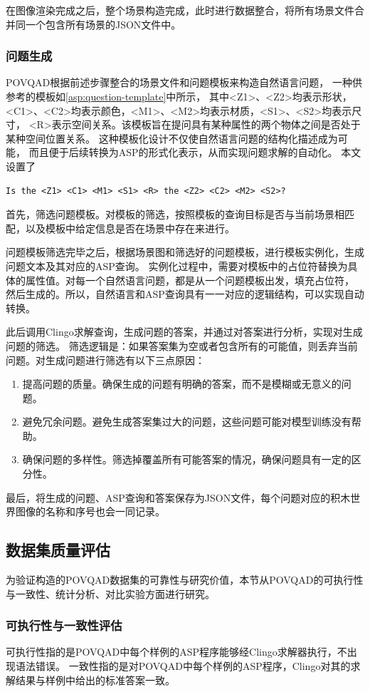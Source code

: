在图像渲染完成之后，整个场景构造完成，此时进行数据整合，将所有场景文件合并同一个包含所有场景的JSON文件中。
\subsubsection{问题生成}
POVQAD根据前述步骤整合的场景文件和问题模板来构造自然语言问题，
一种供参考的模板如\ref{asp:question-template}中所示，
其中<Z1>、<Z2>均表示形状，<C1>、<C2>均表示颜色，<M1>、<M2>均表示材质，<S1>、<S2>均表示尺寸，
<R>表示空间关系。该模板旨在提问具有某种属性的两个物体之间是否处于某种空间位置关系。
这种模板化设计不仅使自然语言问题的结构化描述成为可能，
而且便于后续转换为ASP的形式化表示，从而实现问题求解的自动化。
本文设置了
\begin{lstlisting}[label=asp:question-template]
Is the <Z1> <C1> <M1> <S1> <R> the <Z2> <C2> <M2> <S2>?  
\end{lstlisting}

首先，筛选问题模板。对模板的筛选，按照模板的查询目标是否与当前场景相匹配，以及模板中给定信息是否在场景中存在来进行。

问题模板筛选完毕之后，根据场景图和筛选好的问题模板，进行模板实例化，生成问题文本及其对应的ASP查询。
实例化过程中，需要对模板中的占位符替换为具体的属性值。对每一个自然语言问题，都是从一个问题模板出发，填充占位符，
然后生成的。所以，自然语言和ASP查询具有一一对应的逻辑结构，可以实现自动转换。

此后调用Clingo求解查询，生成问题的答案，并通过对答案进行分析，实现对生成问题的筛选。
筛选逻辑是：如果答案集为空或者包含所有的可能值，则丢弃当前问题。对生成问题进行筛选有以下三点原因：
\begin{enumerate}[nosep]
\item 提高问题的质量。确保生成的问题有明确的答案，而不是模糊或无意义的问题。
\item 避免冗余问题。避免生成答案集过大的问题，这些问题可能对模型训练没有帮助。
\item 确保问题的多样性。筛选掉覆盖所有可能答案的情况，确保问题具有一定的区分性。
\end{enumerate}

最后，将生成的问题、ASP查询和答案保存为JSON文件，每个问题对应的积木世界图像的名称和序号也会一同记录。
\subsection{数据集质量评估}
为验证构造的POVQAD数据集的可靠性与研究价值，本节从POVQAD的可执行性与一致性、统计分析、对比实验方面进行研究。
\subsubsection{可执行性与一致性评估}
可执行性指的是POVQAD中每个样例的ASP程序能够经Clingo求解器执行，不出现语法错误。
一致性指的是对POVQAD中每个样例的ASP程序，Clingo对其的求解结果与样例中给出的标准答案一致。

